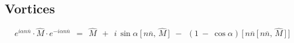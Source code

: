 \documentclass[14pt]{article}
\newcommand{\ov}{\overline}
\newcommand{\nnbar}{n\ov{n}}
\begin{document}
\pagebreak
\begin{center}
\section*{Vortices}
\end{center}

\begin{equation*}
e^{i \alpha \nnbar} \cdot \hat{M} \cdot e^{- i \alpha \nnbar}    ~~=~~
\hat{M}  ~~+~~  i\, \sin \alpha \: \big[\, \nnbar,\, \hat{M} \,\big]
~~-~~  ( 1 ~-~ \cos \alpha )\, \big[\, \nnbar\, \big[\, \nnbar,\, \hat{M} \,\big] \,\big]
\end{equation*}
\end{document}
